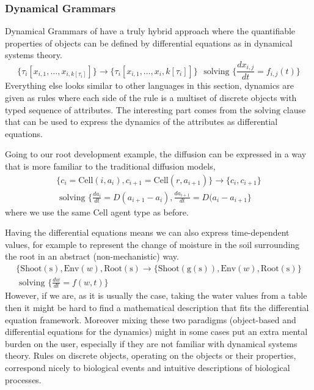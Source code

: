 \documentclass[phd]{infthesis}
\newcommand{\mr}[1]{\mathrm{#1}}
\begin{document}
\subsubsection*{Dynamical Grammars}
Dynamical Grammars of \citet{mjolsness2006stochastic} have a truly hybrid
approach where the quantifiable properties of objects can be defined by
differential equations as in dynamical systems theory.
$$
\{\tau_i[x_{i, 1}, \dots, x_{i, k[\tau_i]}] \} \rightarrow \{\tau_i[x_{i, 1}, \dots, x_i, k[\tau_i]]\} \, \,
\text{ solving } \{\frac{dx_{i,j}}{dt}=f_{i, j}(t)\}
$$
Everything else looks similar to other languages in this section, dynamics are
given as rules where each side of the rule is a multiset of discrete objects
with typed sequence of attributes. The interesting part comes from the
$\mr{solving}$ clause that can be used to express the dynamics of the attributes
as differential equations.

Going to our root development example, the diffusion can be expressed in a way
that is more familiar to the traditional diffusion models,
\begin{align*}
\{c_i=\mr{Cell}(i, a_i), c_{i+1}=\mr{Cell}(r, a_{i+1})\} \rightarrow \{c_i,
  c_{i+1}\} \\
  \text{ solving }\{\frac{da_i}{dt}=D(a_{i+1}-a_i),
  \frac{da_{i+1}}{dt}=D(a_i - a_{i+1} \}
\end{align*}
where we use the same $\mr{Cell}$ agent type as before.

Having the differential equations means we can also express time-dependent
values, for example to represent the change of moisture in the soil surrounding
the root in an abstract (non-mechanistic) way.
\begin{align*}
\{\mr{Shoot(s)}, \mr{Env}(w), \mr{Root(s)} \rightarrow \{\mr{Shoot(g(s))}, \mr{Env}(w),
  \mr{Root(s)} \} \\
  \text{ solving }\{\frac{dw}{dt}=f(w, t) \}
\end{align*}
However, if we are, as it is usually the case, taking the water values from a
table then it might be hard to find a mathematical description that fits the
differential equation framework. Moreover mixing these two paradigms
(object-based and differential equations for the dynamics) might in some cases
put an extra mental burden on the user, especially if they are not familiar with
dynamical systems theory. Rules on discrete objects, operating on the objects or
their properties, correspond nicely to biological events and intuitive
descriptions of biological processes.
\end{document}
